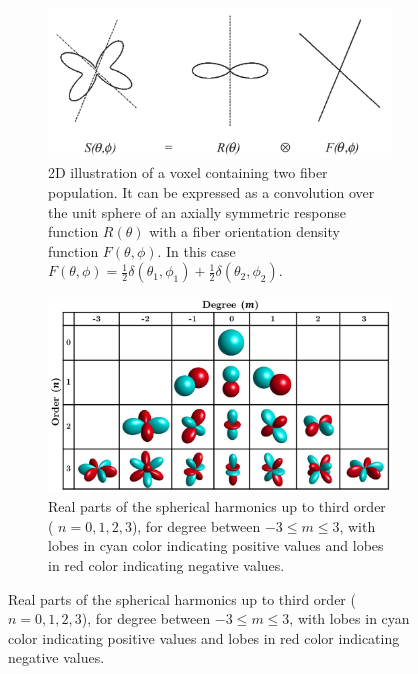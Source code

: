  \begin{figure}
   \centering
   \begin{subfigure}{.47\textwidth}
     \centering
     \includegraphics[width=\linewidth]{images/csv_conv.png}
     \caption{2D illustration of a voxel containing two fiber population. It can be expressed as a convolution over the unit sphere of an axially symmetric response function $R(\theta)$ with a fiber orientation density function $F(\theta, \phi)$. In this case $F(\theta, \phi) = \frac{1}{2}\delta(\theta_1, \phi_1)+\frac{1}{2} \delta(\theta_2, \phi_2)$. \cite{tournier2004direct}}
     \label{fig:csv_conv}
   \end{subfigure}\hfill
   \begin{subfigure}{.47\textwidth}
     \centering
     \includegraphics[width=\linewidth]{images/spherical_harmonics.png}
     \caption{ Real parts of the spherical harmonics up to third order ( $n=0,1,2,3$), for degree between $-3≤m≤3$, with lobes in cyan color indicating positive values and lobes in red color indicating negative values. \cite{e21060579}}
     \label{fig:spherical_harmonics}
   \end{subfigure}
\end{figure}


